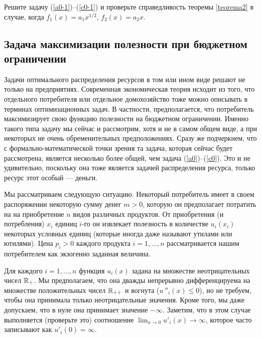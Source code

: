\begin{exer}
    Решите задачу (\ref{a0-1})--(\ref{c0-1}) и проверьте справедливость
    теоремы \ref{teorema2} в случае, когда $f_{1}(x)=a_{1}x^{1/2}$, $f_{2}(x)=a_{2}x$.
\end{exer}


\subsection{Задача максимизации полезности при бюджетном ограничении}

    Задачи оптимального распределения ресурсов в том или ином виде
    решают не только на предприятиях. Современная экономическая
    теория исходит из того, что отдельного потребителя или отдельное
    домохозяйство тоже можно описывать в терминах оптимизационных
    задач. В частности, предполагается, что потребитель максимизирует
    свою функцию полезности на бюджетном ограничении. Именно такого
    типа задачу мы сейчас и рассмотрим, хотя и не в самом общем виде,
    а при некоторых не очень обременительных предположениях. Сразу
    же подчеркнем, что с формально-математической точки зрения та задача,
    которая сейчас будет рассмотрена, является несколько более общей,
    чем задача (\ref{a0})--(\ref{c0}). Это и не удивительно,
    поскольку она  тоже является задачей
    распределения ресурса, только ресурс этот особый --- деньги.

    Мы рассматриваем следующую ситуацию. Некоторый потребитель имеет в своем
    распоряжении некоторую сумму денег $m>0$, которую он
    предполагает потратить на на приобретение $n$ видов различных
    продуктов. От приобретения (и потребления) $x_{i}$ единиц $i$-го он извлекает
    полезность в количестве $u_{i}(x_{i})$ некоторых условных единиц
    (которые иногда даже называют утилами или ютилями). Цена $p_{i}>0$ каждого продукта
    $i=1,\ldots,n$ рассматривается нашим потребителем как экзогенно заданная
    величина.




    Для каждого $i=1,\ldots,n$ функция $u_{i}(x)$ задана на
    множестве неотрицательных чисел $\mathbb{R}_{+}$. Мы
    предполагаем, что она дважды непрерывно дифференцируема на
    множестве положительных чисел $\mathbb{R}_{++}$ и вогнута
    ($u\,''_{i}(x)\leqslant0$), но не требуем, чтобы она принимала
    только неотрицательные значения. Кроме того, мы даже допускаем,
    что в нуле она принимает значение $-\infty$. Заметим, что в этом
    случае выполняется (проверьте это) соотношение
    $\lim_{x\rightarrow0}u'_{i}(x)\rightarrow\infty$, которое часто
    записывают как $u'_{i}(0)=\infty$.

